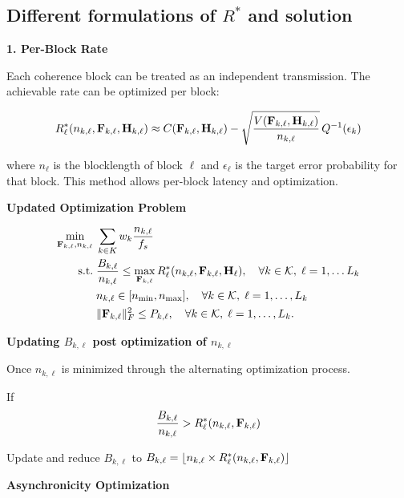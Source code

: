 \documentclass[a4paper, 12pt, onecolumn, journal, twoside, draftclsnofoot]{IEEEtran}
\begin{document}
\subsection{Different formulations of $R^*$ and solution}

\textbf{1. Per-Block Rate}

Each coherence block can be treated as an independent transmission. The achievable rate can be optimized per block:

\begin{equation*}
	R^*_\ell(n_{k,\ell}, {\bf F}_{k,\ell}, {\bf H}_{k,\ell}) \approx C({\bf F}_{k,\ell}, {\bf H}_{k,\ell}) - \sqrt{\frac{V({\bf F}_{k,\ell}, {\bf H}_{k,\ell})}{n_{k,\ell}} } \, Q^{-1}(\epsilon_k)
\end{equation*}

where $n_\ell$ is the blocklength of block $\ell$ and $\epsilon_\ell$ is the target error probability for that block. This method allows per-block latency and optimization.

\textbf{Updated Optimization Problem} 

\begin{equation*}
	\begin{split}
		\min_{{\bf F}_{k,\ell}, n_{k,\ell}} \;& \sum_{k \in K} w_k \frac{n_{k,\ell}}{f_s} \\
		\text{s.t.}\;& \frac{B_{k,\ell}}{n_{k,\ell}} \leq \max_{{\bf F}_{k, \ell}} R^*_\ell(n_{k,\ell}, {\bf F}_{k, \ell},  {\bf H}_\ell), \quad \forall k \in { \mathcal{K} }, \; \ell = 1, \ldots L_k \\ 
		& n_{k,\ell} \in [n_{\text{min}}, n_{\text{max}}], \quad \forall k \in { \mathcal{K} }, \; \ell = 1, \ldots, L_k \\
		& \|{\bf F}_{k,\ell}\|_F^2 \leq P_{k,\ell}, \quad \forall k \in { \mathcal{K} }, \; \ell = 1, \ldots, L_k.
	\end{split}
\end{equation*}


\textbf{Updating $B_{k, \ell}$ post optimization of $n_{k,\ell}$}

Once $n_{k, \ell}$ is minimized through the alternating optimization process.

If 
\begin{equation*}
	\frac{B_{k,\ell}}{n_{k,\ell}} > R^*_\ell(n_{k,\ell}, {\bf F}_{k, \ell})
\end{equation*}

Update and reduce $B_{k, \ell}$ to $B_{k, \ell} =  \lfloor n_{k, \ell} \times R^*_\ell(n_{k,\ell}, {\bf F}_{k, \ell}) \rfloor$

\textbf{Asynchronicity Optimization}
\end{document}
